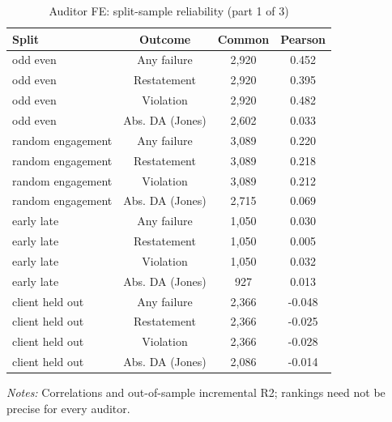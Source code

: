 \begin{table}[htbp]
\footnotesize
\centering
\caption{Auditor FE: split-sample reliability (part 1 of 3)}
\begin{threeparttable}
\begin{tabular}{p{}ccc}
\toprule
Split & Outcome & Common & Pearson \\
\midrule
odd even & Any failure & 2,920 & 0.452 \\
odd even & Restatement & 2,920 & 0.395 \\
odd even & Violation & 2,920 & 0.482 \\
odd even & Abs. DA (Jones) & 2,602 & 0.033 \\
random engagement & Any failure & 3,089 & 0.220 \\
random engagement & Restatement & 3,089 & 0.218 \\
random engagement & Violation & 3,089 & 0.212 \\
random engagement & Abs. DA (Jones) & 2,715 & 0.069 \\
early late & Any failure & 1,050 & 0.030 \\
early late & Restatement & 1,050 & 0.005 \\
early late & Violation & 1,050 & 0.032 \\
early late & Abs. DA (Jones) & 927 & 0.013 \\
client held out & Any failure & 2,366 & -0.048 \\
client held out & Restatement & 2,366 & -0.025 \\
client held out & Violation & 2,366 & -0.028 \\
client held out & Abs. DA (Jones) & 2,086 & -0.014 \\
\bottomrule
\end{tabular}
\begin{tablenotes}\footnotesize
\item \raggedright \textit{Notes:} Correlations and out-of-sample incremental R2; rankings need not be precise for every auditor.
\end{tablenotes}
\end{threeparttable}
\end{table}

